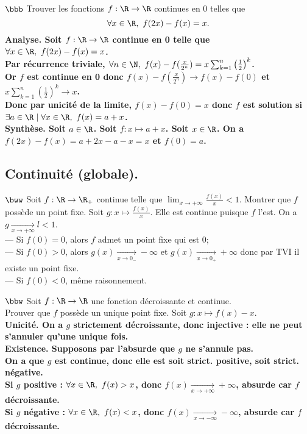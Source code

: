 \documentclass[11pt]{article}
\begin{document}
\begin{exercice}{$\bbb$}{}
    Trouver les fonctions $f:\R\to\R$ continues en 0 telles que
    \begin{equation*}
        \forall x \in \R, ~ f(2x)-f(x)=x.
    \end{equation*}
    \tcblower
    \bf{Analyse.} Soit $f:\R\to\R$ continue en 0 telle que $\forall x \in \R, ~ f(2x)-f(x)=x$.\\
    Par récurrence triviale, $\forall n \in \N, ~ f(x)-f(\frac{x}{2^n})=x\sum_{k=1}^n\left( \frac{1}{2} \right)^k$.\\
    Or $f$ est continue en 0 donc $f(x)-f(\frac{x}{2^n})\to f(x)-f(0)$ et $x\sum_{k=1}^n\left( \frac{1}{2} \right)^k\to x$.\\
    Donc par unicité de la limite, $f(x)-f(0)=x$ donc $f$ est solution si $\exists a \in \R \mid \forall x \in \R, ~ f(x)=a+x$.\\
    \bf{Synthèse.} Soit $a\in\R$. Soit $f:x\mapsto a + x$. Soit $x\in\R$. On a $f(2x)-f(x)=a+2x-a-x=x$ et $f(0)=a$.
\end{exercice}

\subsection*{Continuité (globale).}

\begin{exercice}{$\bww$}{}
    Soit $f:\R\to\R_+$ continue telle que $\lim_{x\to+\infty}\frac{f(x)}{x}<1$. Montrer que $f$ possède un point fixe.
    \tcblower
    Soit $g:x\mapsto\frac{f(x)}{x}$. Elle est continue puisque $f$ l'est. On a $g\xrightarrow[x\to+\infty]{}l<1$.\\
    --- Si $f(0)=0$, alors $f$ admet un point fixe qui est 0;\\
    --- Si $f(0)>0$, alors $g(x)\xrightarrow[x\to0_-]{}-\infty$ et $g(x)\xrightarrow[x\to0_+]{}+\infty$ donc par TVI il existe un point fixe.\\
    --- Si $f(0)<0$, même raisonnement.
\end{exercice}

\begin{exercice}{$\bbw$}{}
    Soit $f:\R\to\R$ une fonction décroissante et continue.\\
    Prouver que $f$ possède un unique point fixe.
    \tcblower
    Soit $g:x\mapsto f(x)-x$.\\
    \bf{Unicité.} On a $g$ strictement décroissante, donc injective : elle ne peut s'annuler qu'une unique fois.\\
    \bf{Existence.} Supposons par l'absurde que $g$ ne s'annule pas.\\
    On a que $g$ est continue, donc elle est soit strict. positive, soit strict. négative.\\
    Si $g$ positive : $\forall x \in \R, ~ f(x)>x$, donc $f(x)\xrightarrow[x\to+\infty]{}+\infty$, absurde car $f$ décroissante.\\
    Si $g$ négative : $\forall x \in \R, ~ f(x)<x$, donc $f(x)\xrightarrow[x\to-\infty]{}-\infty$, absurde car $f$ décroissante.
\end{exercice}
\end{document}
